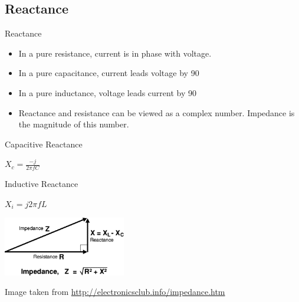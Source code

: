 \documentclass{beamer}
\begin{document}
\subsection{Reactance}
\begin{frame}{Reactance}{}
\begin{itemize}
\item In a pure resistance, current is in phase with voltage.
\item In a pure capacitance, current leads voltage by 90\textdegree
\item In a pure inductance, voltage leads current by 90\textdegree
\item Reactance and resistance can be viewed as a complex number. Impedance is the magnitude of this number.
\end{itemize}

\parbox{0.48\textwidth}{

Capacitive Reactance

$X_c=\frac{-j}{2\pi fC}$
}
\parbox{0.48\textwidth}{
Inductive Reactance

$X_i=j2\pi fL$
}
\includegraphics[width=0.4\textwidth]{images/imped.png}

Image taken from \url{http://electronicsclub.info/impedance.htm}
\end{frame}
\end{document}
